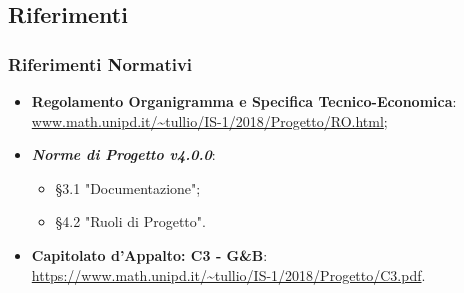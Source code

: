 \subsection{Riferimenti}
\subsubsection{Riferimenti Normativi}
\begin{itemize}
	\item \textbf{Regolamento Organigramma e Specifica Tecnico-Economica}:\-\\ \url{www.math.unipd.it/~tullio/IS-1/2018/Progetto/RO.html};
	\item \textbf{\textit{Norme di Progetto v4.0.0}}:
		\begin{itemize}
			\item §3.1 "Documentazione";
			\item §4.2 "Ruoli di Progetto".
		\end{itemize}
	\item \textbf{Capitolato d'Appalto: C3 - G\&B}:\-\\ \url{https://www.math.unipd.it/~tullio/IS-1/2018/Progetto/C3.pdf}.
\end{itemize}

